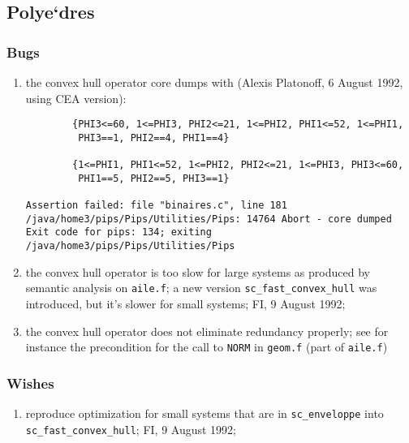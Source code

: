 \subsection{Polye`dres}

\subsubsection{Bugs}

\begin{enumerate}

  \item the convex hull operator core dumps with (Alexis Platonoff,
	6 August 1992, using CEA version):

\begin{verbatim}
        {PHI3<=60, 1<=PHI3, PHI2<=21, 1<=PHI2, PHI1<=52, 1<=PHI1,
         PHI3==1, PHI2==4, PHI1==4}

        {1<=PHI1, PHI1<=52, 1<=PHI2, PHI2<=21, 1<=PHI3, PHI3<=60,
         PHI1==5, PHI2==5, PHI3==1}

Assertion failed: file "binaires.c", line 181
/java/home3/pips/Pips/Utilities/Pips: 14764 Abort - core dumped
Exit code for pips: 134; exiting /java/home3/pips/Pips/Utilities/Pips
\end{verbatim}

  \item the convex hull operator is too slow for large systems as produced
	by semantic analysis on \verb+aile.f+; a new version
	\verb+sc_fast_convex_hull+ was introduced, but it's slower
	for small systems; FI, 9 August 1992;

  \item the convex hull operator does not eliminate redundancy properly;
	see for instance the precondition for the call to \verb+NORM+
	in \verb+geom.f+ (part of \verb+aile.f+)

\end{enumerate}

\subsubsection{Wishes}

\begin{enumerate}

  \item reproduce optimization for small systems that are in 
	\verb+sc_enveloppe+ into \verb+sc_fast_convex_hull+;
	FI, 9 August 1992;

\end{enumerate}


